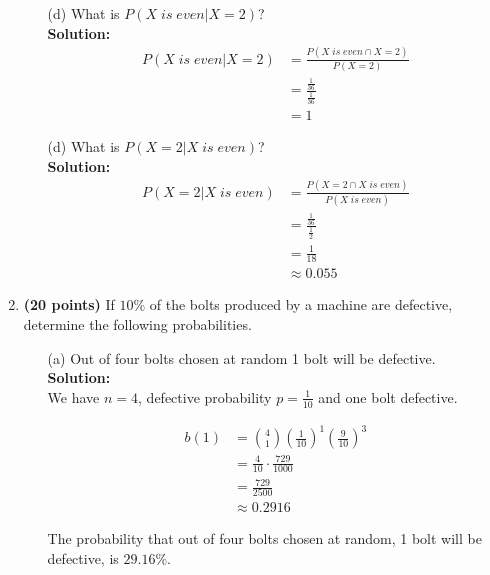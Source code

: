 \documentclass[a4paper]{article}
\begin{document}
\begin{enumerate}
\begin{enumerate}
	\item[(d)] What is $P(X \; is \; even|X = 2)$?\\
	\textbf{Solution:}\\

\begin{align*}
P(X \; is \; even|X = 2) &= \frac{P(X \; is \; even \cap X = 2)}{P(X = 2)}\\	
&= \frac{\frac{1}{36}}{\frac{1}{36}}\\
&= 1
\end{align*}	

\newpage	
	\item[(d)] What is $P(X = 2| X \; is \; even)$?\\
	\textbf{Solution:}\\
	
\begin{align*}
P(X = 2 | X \; is \; even) &= \frac{P(  X = 2 \cap X \; is \; even)}{P(X \; is \; even)}\\
&= \frac{\frac{1}{36}}{\frac{1}{2}}\\
&= \frac{1}{18}\\
&\approx 0.055
\end{align*}	
	
	
	
\end{enumerate}



\item \textbf{(20 points)} If $10\%$ of the bolts produced by a machine are defective, determine the following probabilities.

\begin{enumerate}
	\item[(a)] Out of four bolts chosen at random 1 bolt will be defective.\\
	\textbf{Solution:}\\
	
We have $n = 4$, defective probability $p = \frac{1}{10}$ and one bolt defective.	
	
\begin{align*}
	b(1) &= {4 \choose 1}(\frac{1}{10})^1(\frac{9}{10})^3\\
	&= \frac{4}{10} \cdot \frac{729}{1000}\\
	&= \frac{729}{2500}\\
	&\approx 0.2916
\end{align*}

The probability that out of four bolts chosen at random, 1 bolt will be defective, is $29.16\%$.\\
	

\end{enumerate}
\end{enumerate}
\end{document}
